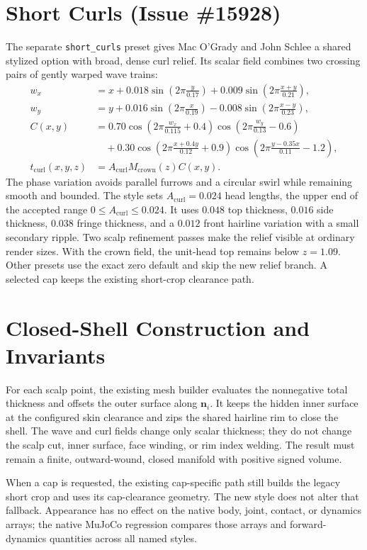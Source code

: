 \documentclass[11pt]{article}
\begin{document}
\section{Short Curls (Issue \#15928)}
The separate \texttt{short\_curls} preset gives Mac O'Grady and John Schlee a
shared stylized option with broad, dense curl relief. Its scalar field combines
two crossing pairs of gently warped wave trains:
\begin{align}
w_x &= x+0.018\sin\left(2\pi\frac{y}{0.17}\right)
 + 0.009\sin\left(2\pi\frac{x+y}{0.21}\right),\\
w_y &= y+0.016\sin\left(2\pi\frac{x}{0.19}\right)
 - 0.008\sin\left(2\pi\frac{x-y}{0.23}\right),\\
C(x,y) &= 0.70\cos\left(2\pi\frac{w_x}{0.115}+0.4\right)
 \cos\left(2\pi\frac{w_y}{0.13}-0.6\right)\\
&\quad + 0.30\cos\left(2\pi\frac{x+0.4y}{0.12}+0.9\right)
 \cos\left(2\pi\frac{y-0.35x}{0.11}-1.2\right),\\
t_{\mathrm{curl}}(x,y,z) &= A_{\mathrm{curl}}M_{\mathrm{crown}}(z)C(x,y).
\end{align}
The phase variation avoids parallel furrows and a circular swirl while
remaining smooth and bounded. The style sets $A_{\mathrm{curl}}=0.024$ head
lengths, the upper end of the accepted range
$0\leq A_{\mathrm{curl}}\leq0.024$. It uses $0.048$ top thickness,
$0.016$ side thickness, $0.038$ fringe thickness, and a $0.012$ front
hairline variation with a small secondary ripple. Two scalp refinement passes
make the relief visible at ordinary render sizes. With the crown field, the unit-head top remains below
$z=1.09$. Other presets use the exact zero default and skip the new relief
branch. A selected cap keeps the existing short-crop clearance path.

\section{Closed-Shell Construction and Invariants}
For each scalp point, the existing mesh builder evaluates the nonnegative
total thickness and offsets the outer surface along $\mathbf{n}_i$. It keeps
the hidden inner surface at the configured skin clearance and zips the shared
hairline rim to close the shell. The wave and curl fields change only scalar
thickness; they do not change the scalp cut, inner surface, face winding, or
rim index welding. The result must remain a finite, outward-wound, closed
manifold with positive signed volume.

When a cap is requested, the existing cap-specific path still builds the
legacy short crop and uses its cap-clearance geometry. The new style does not
alter that fallback. Appearance has no effect on the native body, joint,
contact, or dynamics arrays; the native MuJoCo regression compares those
arrays and forward-dynamics quantities across all named styles.
\end{document}
